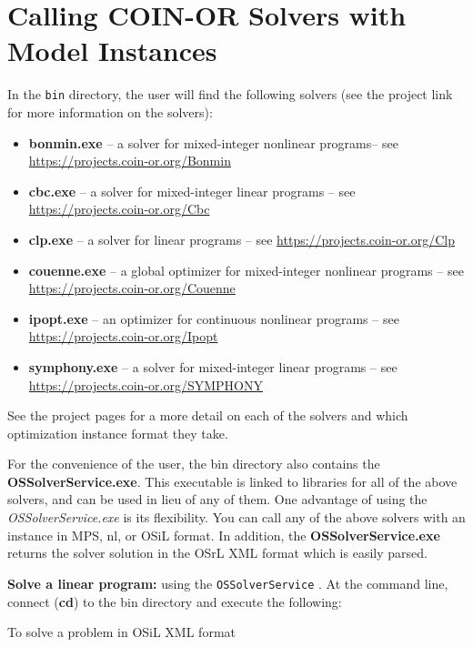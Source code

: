 \documentclass[11pt]{article}
\renewcommand{\_}{{\char"5F}}
\renewcommand{\{}{{\char"7B}}
\renewcommand{\}}{{\char"7D}}
\renewcommand{\^}{{\char"0D}}
\renewcommand{\'}{{\char"0D}}
\begin{document}
\section{Calling COIN-OR Solvers with Model Instances}

In the {\tt bin} directory, the user will find the following solvers (see the project link for more information on the solvers):
\begin{itemize}
\item {\bf bonmin.exe} -- a solver for mixed-integer nonlinear programs-- see \url{https://projects.coin-or.org/Bonmin}

\item {\bf cbc.exe} --  a solver for mixed-integer linear programs --  see \url{https://projects.coin-or.org/Cbc}

\item {\bf clp.exe} -- a solver for linear programs  -- see \url{https://projects.coin-or.org/Clp}

\item {\bf couenne.exe} -- a global optimizer for mixed-integer nonlinear programs  -- see \url{https://projects.coin-or.org/Couenne}

\item {\bf ipopt.exe} -- an optimizer for continuous nonlinear programs -- see \url{https://projects.coin-or.org/Ipopt}

\item {\bf symphony.exe} -- a solver for mixed-integer linear programs -- see \url{https://projects.coin-or.org/SYMPHONY}
\end{itemize}

See the project pages for a more detail on each of the solvers and which optimization instance format they take.

For the convenience of the user, the bin directory also contains the {\bf OSSolverService.exe}.  This executable is linked to libraries for all of the above solvers, and can be used in lieu of any of them. One advantage of using the {\it OSSolverService.exe}  is its flexibility. You can call any of the above solvers with an instance in MPS, nl, or OSiL format.   In addition, the {\bf OSSolverService.exe} returns the solver solution in the OSrL XML format which is easily parsed. 


{\bf Solve a  linear program:}  using the  {\tt OSSolverService} .  At the command line,  connect ({\bf cd}) to the bin directory and execute the following:


\vfill
\begin{center}
To solve  a problem in OSiL XML format
\end{center}
\vfill
\end{document}
